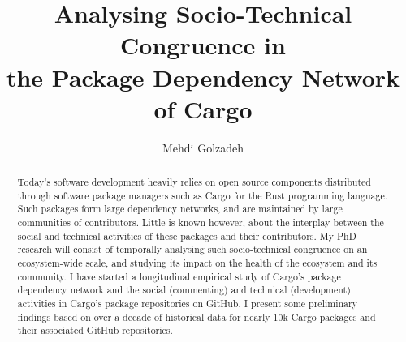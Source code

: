 



\renewcommand\footnotetextcopyrightpermission[1]{} %
\pagestyle{plain}

\usepackage{amssymb}%
\usepackage{pifont}%

\newcommand{\commentty}[1]{{\color{blue} \sf (TY: #1)}}
\newcommand{\commentlh}[1]{{\color{red} \sf (LH: #1)}}

\def\BibTeX{{\rm B\kern-.05em{\sc i\kern-.025em b}\kern-.08em
		T\kern-.1667em\lower.7ex\hbox{E}\kern-.125emX}}





	
\title{Analysing Socio-Technical Congruence in\\ the Package Dependency Network of Cargo}

	\author{Mehdi Golzadeh}
	
	\newcommand*{\Scale}[2][4]{\scalebox{#1}{$#2$}}%
	\newcommand{\Tool}{ComAir\xspace}
	\newcommand{\ComBugs}{30\xspace}
	
	
	
	
	
\begin{abstract}
Today's software development heavily relies on open source components distributed through software package managers such as Cargo for the Rust programming language. Such packages form large dependency networks, and are maintained by large communities of contributors. Little is known however, about the interplay between the social and technical activities of these packages and their contributors. My PhD research will consist of temporally analysing such socio-technical congruence on an ecosystem-wide scale, and studying its impact on the health of the ecosystem and its community.
I have started a longitudinal empirical study of Cargo's package dependency network and the social (commenting) and technical (development) activities in Cargo’s package repositories on GitHub. I present some preliminary findings based on over a decade of historical data for nearly 10k Cargo packages and their associated GitHub repositories.
\end{abstract}
	
